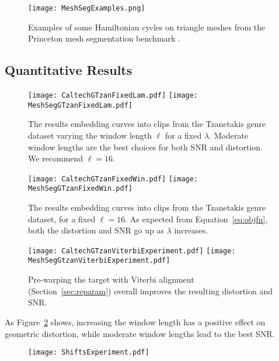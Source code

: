 \documentclass[runningheads]{llncs}
\begin{document}
\begin{figure}
  \centering
  \texttt{[image: MeshSegExamples.png]}
  \caption{Examples of some Hamiltonian cycles on triangle meshes from the Princeton mesh segmentation benchmark \cite{Chen:2009:ABF}.}
  \label{fig:meshsegexamples}
\end{figure}

\subsection{Quantitative Results}


\begin{figure}
  \centering
  \texttt{[image: CaltechGTzanFixedLam.pdf]}
  \texttt{[image: MeshSegGTzanFixedLam.pdf]}
  \caption{The results embedding curves into clips from the Tzanetakis genre dataset varying the window length $\ell$ for a fixed $\lambda$.  Moderate window lengths are the best choices for both SNR and distortion.  We recommend $\ell=16$.}
  \label{fig:ResultsFixedLam}
\end{figure}

\begin{figure}
  \centering
  \texttt{[image: CaltechGTzanFixedWin.pdf]}
  \texttt{[image: MeshSegGTzanFixedWin.pdf]}
  \caption{The results embedding curves into clips from the Tzanetakis genre dataset, for a fixed $\ell=16$.  As expected from Equation~\ref{eq:objfn}, both the distortion and SNR go up as $\lambda$ increases.}
  \label{fig:ResultsFixedWin}
\end{figure}

\begin{figure}
  \centering
  \texttt{[image: CaltechGTzanViterbiExperiment.pdf]}
  \texttt{[image: MeshSegGtzanViterbiExperiment.pdf]}
  \caption{Pre-warping the target with Viterbi alignment (Section~\ref{sec:reparam}) overall improves the resulting distortion and SNR.}
  \label{fig:ResultsViterbiExperiment}
\end{figure}

As Figure~\ref{fig:ResultsFixedLam} shows, increasing the window length has a positive effect on geometric distortion, while moderate window lengths lead to the best SNR.

\begin{figure}
  \centering
  \texttt{[image: ShiftsExperiment.pdf]}
  \caption{}
  \label{fig:ShiftsExperiment}
\end{figure}
\end{document}
